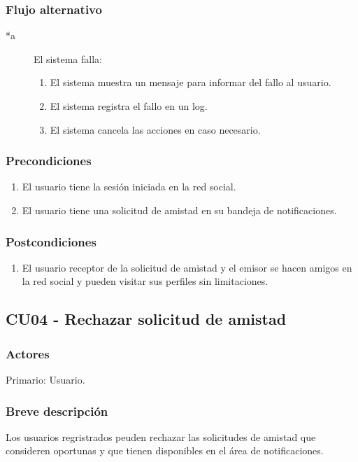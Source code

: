 \documentclass[12pt, a4paper, titlepage]{article}
\begin{document}
\subsubsection{Flujo alternativo}
\begin{description}
	\item [*a] El sistema falla:
	\begin{enumerate}
		\item El sistema muestra un mensaje para informar del fallo al usuario.
		\item El sistema registra el fallo en un log.
		\item El sistema cancela las acciones en caso necesario.
	\end{enumerate}
\end{description}

\subsubsection{Precondiciones}
\begin{enumerate}
	\item El usuario tiene la sesión iniciada en la red social.
	\item El usuario tiene una solicitud de amistad en su bandeja de notificaciones.
\end{enumerate}
\subsubsection{Postcondiciones}
\begin{enumerate}
	\item El usuario receptor de la solicitud de amistad y el emisor se hacen amigos en la red social y pueden visitar sus perfiles sin limitaciones.
\end{enumerate}


\subsection{CU04 - Rechazar solicitud de amistad}
\subsubsection{Actores}
Primario: Usuario.
\subsubsection{Breve descripción}
Los usuarios regristrados peuden rechazar las solicitudes de amistad que consideren oportunas y que tienen disponibles en el área de notificaciones.
\end{document}
